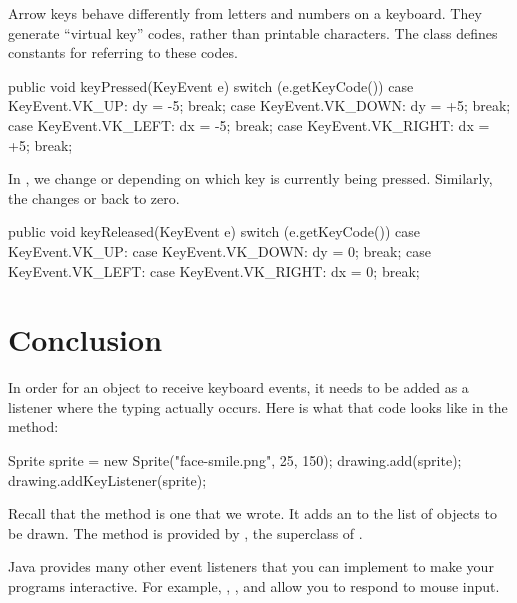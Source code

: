 Arrow keys behave differently from letters and numbers on a keyboard.
They generate ``virtual key'' codes, rather than printable characters.
The  class defines constants for referring to these codes.

\begin{code}
public void keyPressed(KeyEvent e) {
    switch (e.getKeyCode()) {
        case KeyEvent.VK_UP:
            dy = -5;
            break;
        case KeyEvent.VK_DOWN:
            dy = +5;
            break;
        case KeyEvent.VK_LEFT:
            dx = -5;
            break;
        case KeyEvent.VK_RIGHT:
            dx = +5;
            break;
    }
}
\end{code}

In , we change  or  depending on which key is currently being pressed.
Similarly, the  changes  or  back to zero.

\begin{code}
public void keyReleased(KeyEvent e) {
    switch (e.getKeyCode()) {
        case KeyEvent.VK_UP:
        case KeyEvent.VK_DOWN:
            dy = 0;
            break;
        case KeyEvent.VK_LEFT:
        case KeyEvent.VK_RIGHT:
            dx = 0;
            break;
    }
}
\end{code}


\section{Conclusion}

In order for an object to receive keyboard events, it needs to be added as a listener where the typing actually occurs.
Here is what that code looks like in the  method:

\begin{code}
Sprite sprite = new Sprite("face-smile.png", 25, 150);
drawing.add(sprite);
drawing.addKeyListener(sprite);
\end{code}

Recall that the  method is one that we wrote.
It adds an  to the list of objects to be drawn.
The  method is provided by , the superclass of .

Java provides many other event listeners that you can implement to make your programs interactive.
For example, , , and  allow you to respond to mouse input.

